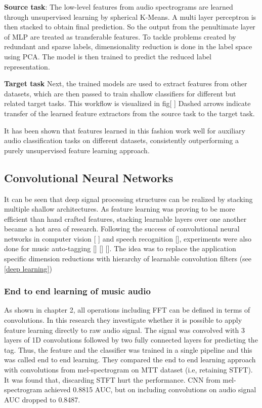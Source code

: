 \noindent \textbf{Source task}: 
The low-level features from audio spectrograms are learned through unsupervised learning by spherical K-Means. A multi layer perceptron is then stacked to obtain final prediction. So the output from the penultimate layer of MLP are treated as transferable features. To tackle problems created by redundant and sparse labels, dimensionality reduction is done in the label space using PCA. The model is then trained to predict the reduced label representation.
\bigskip

\noindent \textbf{Target task}
Next,  the trained models are used to extract features from other datasets, which are then passed to train shallow classifiers for different but related target tasks. This workflow is visualized in fig[ ] Dashed arrows indicate transfer of the learned feature extractors from the source task to the target task.
\bigskip

\noindent It has been shown that features learned in this fashion work well for auxiliary audio classification tasks on different datasets, consistently outperforming a purely unsupervised feature learning approach.

\subsection{Convolutional Neural Networks}
It can be seen that deep signal processing structures can be realized by stacking multiple shallow architectures. As feature learning was proving to be more efficient than hand crafted features, stacking learnable layers over one another became a hot area of research. Following the success of convolutional neural networks in computer vision [ ] and speech recognition [], experiments were also done for music auto-tagging [] [] []. The idea was to replace the application specific dimension reductions with hierarchy of learnable convolution filters (see \ref{deep learning}) 

\subsubsection{End to end learning of music audio}
As shown in chapter 2, all operations including FFT can be defined in terms of convolutions. In this research they investigate whether it is possible to apply feature learning directly to raw audio signal. The signal was convolved with 3 layers of 1D convolutions followed by two fully connected layers for predicting the tag. Thus, the feature and the classifier was trained in a single pipeline and this was called end to end learning. They compared the end to end learning approach with convolutions from mel-spectrogram on MTT dataset (i.e, retaining STFT). It was found that, discarding STFT hurt the performance. CNN from mel-spectrogram achieved 0.8815 AUC, but on including convolutions on audio signal AUC dropped to 0.8487.     
 
